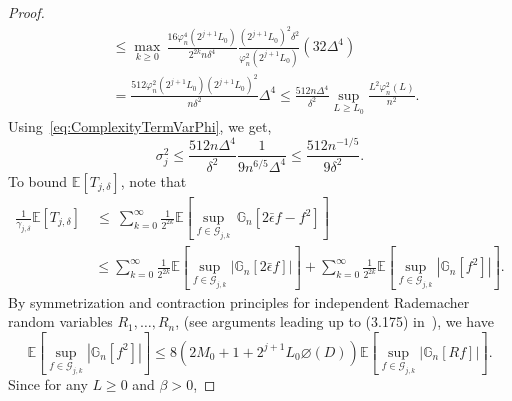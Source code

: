 \begin{proof}
\begin{equation*}
\begin{split}
&\le \max_{k\ge 0}\,\frac{16\varphi_n^4(2^{j+1}L_0)}{2^{2k}n\delta^4}\frac{(2^{j+1}L_0)^2\delta^2}{\varphi_n^2(2^{j+1}L_0)}(32\Delta^4)\\ &= \frac{512\varphi_n^2(2^{j+1}L_0)(2^{j+1}L_0)^2}{n\delta^2}\Delta^4 \le \frac{512n\Delta^4}{\delta^2}\sup_{L\ge L_0}\frac{L^2\varphi_n^2(L)}{n^2}.
\end{split}
\end{equation*}
Using~\eqref{eq:ComplexityTermVarPhi}, we get,
\begin{equation}\label{eq:TjSigmaBound}
\sigma_j^2 \le \frac{512n\Delta^4}{\delta^2}\frac{1}{9n^{6/5}\Delta^4} \le \frac{512n^{-1/5}}{9\delta^2}.%
\end{equation}
To bound $\mathbb{E}\left[T_{j,\delta}\right]$, note that
\begin{equation}\label{eq:FirstBoundTj}
\begin{split}
\frac{1}{\gamma_{j,\delta}}\mathbb{E}\left[T_{j,\delta}\right] &~\le~ \sum_{k = 0}^{\infty} \frac{1}{2^{2k}}\mathbb{E}\left[\sup_{f\in\mathcal{G}_{j,k}}\,\mathbb{G}_n\left[2\bar\epsilon  f - f^2\right]\right]\\
&\,\le \sum_{k = 0}^{\infty} \frac{1}{2^{2k}}\mathbb{E}\left[\sup_{f\in\mathcal{G}_{j,k}}\left|\mathbb{G}_n\left[2\bar\epsilon f\right]\right|\right] + \sum_{k = 0}^{\infty} \frac{1}{2^{2k}}\mathbb{E}\left[\sup_{f\in\mathcal{G}_{j,k}}\left|\mathbb{G}_n\left[f^2\right]\right|\right].%
\end{split}
\end{equation}
By symmetrization and contraction principles for independent Rademacher random variables $R_1, \ldots, R_n$, (see arguments  leading up to (3.175) in~\cite{Gine16}), we have 
\begin{equation}\label{eq:Contraction}
\mathbb{E}\left[\sup_{f\in\mathcal{G}_{j,k}}\left|\mathbb{G}_n\left[f^2\right]\right|\right] \le 8(2M_0 + 1 + 2^{j+1}L_0\diameter(D))\mathbb{E}\left[\sup_{f\in\mathcal{G}_{j,k}}\left|\mathbb{G}_n\left[Rf\right]\right|\right].
\end{equation}
Since for any $L \ge 0$ and $\beta > 0$,

\end{proof}
